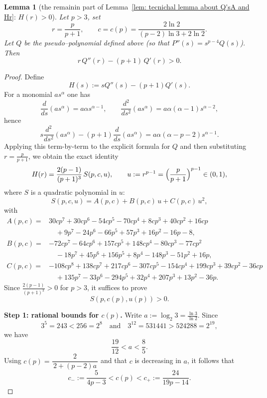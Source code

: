 \documentclass[11pt]{article}
\newtheorem{lemma}[theorem]{Lemma}
\theoremstyle{definition}
\newcommand{\1}{\mathbf{1}}
\begin{document}
\begin{lemma}[the remainin part of Lemma~\ref{lem: tecnichal lemma about Q'sA and Hr}: $H(r)>0$]\label{lem:Hr-positive}
Let $p>3$, set
\[
r=\frac{p}{p+1},
\qquad
c=c(p)=\frac{2\ln 2}{(p-2)\ln 3+2\ln 2}.
\]
Let $Q$ be the pseudo--polynomial defined above (so that $P''(s)=s^{p-4}Q(s)$).
Then
\[
r\,Q''(r)-(p+1)\,Q'(r)>0.
\]
\end{lemma}

\begin{proof}
Define
\[
H(s):=sQ''(s)-(p+1)Q'(s).
\]
For a monomial $a s^\alpha$ one has
\[
\frac{d}{ds}(a s^\alpha)=a\alpha s^{\alpha-1},\qquad
\frac{d^2}{ds^2}(a s^\alpha)=a\alpha(\alpha-1)s^{\alpha-2},
\]
hence
\[
s\frac{d^2}{ds^2}(a s^\alpha)-(p+1)\frac{d}{ds}(a s^\alpha)
= a\alpha(\alpha-p-2)s^{\alpha-1}.
\]
Applying this term-by-term to the explicit formula for $Q$ and then substituting
$r=\frac{p}{p+1}$, we obtain the exact identity
\begin{equation}\label{eq:H-reduction}
H(r)=\frac{2(p-1)}{(p+1)^3}\,S(p,c,u),
\qquad
u:=r^{p-1}=\Bigl(\frac{p}{p+1}\Bigr)^{p-1}\in(0,1),
\end{equation}
where $S$ is a quadratic polynomial in $u$:
\[
S(p,c,u)=A(p,c)+B(p,c)\,u+C(p,c)\,u^2,
\]
with
\begin{align*}
A(p,c)={}&
30cp^7+30cp^6-54cp^5-70cp^4+8cp^3+40cp^2+16cp\\
&\quad +9p^7-24p^6-66p^5+57p^3+16p^2-16p-8,\\[2mm]
B(p,c)={}&
-72cp^7-64cp^6+157cp^5+148cp^4-80cp^3-77cp^2\\
&\quad -18p^7+45p^6+156p^5+8p^4-148p^3-51p^2+16p,\\[2mm]
C(p,c)={}&
-108cp^8+138cp^7+217cp^6-307cp^5-154cp^4+199cp^3+39cp^2-36cp\\
&\quad +135p^7-33p^6-294p^5+32p^4+207p^3+13p^2-36p.
\end{align*}
Since $\frac{2(p-1)}{(p+1)^3}>0$ for $p>3$, it suffices to prove
\begin{equation}\label{eq:S-positive-goal}
S(p,c(p),u(p))>0.
\end{equation}

\medskip
\noindent\textbf{Step 1: rational bounds for $c(p)$.}
Write $a:=\log_2 3=\frac{\ln 3}{\ln 2}$. Since
\[
3^5=243<256=2^8
\quad\text{and}\quad
3^{12}=531441>524288=2^{19},
\]
we have
\[
\frac{19}{12}<a<\frac85.
\]
Using $c(p)=\dfrac{2}{\,2+(p-2)a\,}$ and that $c$ is decreasing in $a$, it follows that
\begin{equation}\label{eq:c-bounds-sharp}
c_-:=\frac{5}{4p-3}<c(p)<c_+:=\frac{24}{19p-14}.
\end{equation}


\end{proof}
\end{document}
